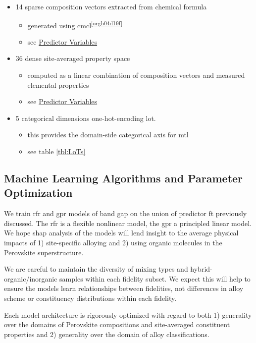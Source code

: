 \documentclass[aip, jmp, amsmath, amssymb, nofootinbib]{revtex4-2}
\begin{document}
\begin{itemize}
\item 14 sparse composition vectors extracted from chemical formula
\begin{itemize}
\item generated using cmcl\textsuperscript{\ref{orgb04d19f}}
\item see \hyperref[sec:orgb09a235]{Predictor Variables}
\end{itemize}
\item 36 dense site-averaged property space
\begin{itemize}
\item computed as a linear combination of composition vectors and
measured elemental properties\cite{mentel-2014}
\item see \hyperref[sec:orgb09a235]{Predictor Variables}
\end{itemize}
\item 5 categorical dimensions one-hot-encoding \gls{lot}.
\begin{itemize}
\item this provides the domain-side categorical axis for \gls{mtl}
\item see table \ref{tbl:LoTs}
\end{itemize}
\end{itemize}

\subsection*{Machine Learning Algorithms and Parameter Optimization}
\label{sec:org8797f1e}
We train \acrshort{rfr} and \acrshort{gpr} models of band gap on the union of predictor
\gls{ft} previously discussed. The \acrshort{rfr} is a flexible nonlinear model,
the \acrshort{gpr} a principled linear model. We hope \Acrfull{shap} analysis of the models will lend insight to the
average physical impacts of 1) site-specific alloying and 2) using
organic molecules in the Perovskite superstructure.

We are careful to maintain the diversity of mixing types and
hybrid-organic/inorganic samples within each fidelity subset. We
expect this will help to ensure the models learn relationships between
fidelities, not differences in alloy scheme or constituency
distributions within each fidelity.

Each model architecture is rigorously optimized with regard to both 1)
generality over the domains of Perovskite compositions and
site-averaged constituent properties and 2) generality over the domain
of alloy classifications.
\end{document}

